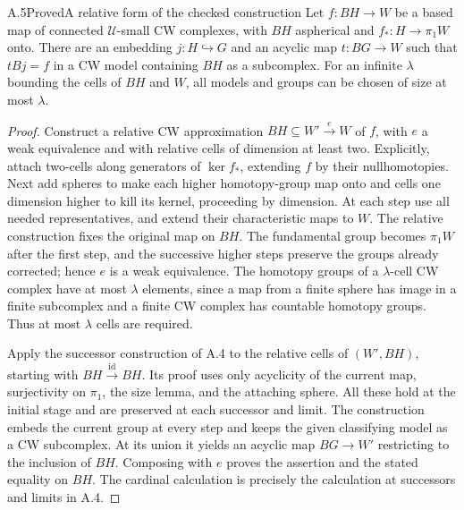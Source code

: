 \begin{claim}{A.5}{Proved}{A relative form of the checked construction}
Let $f:BH\to W$ be a based map of connected $\mathcal U$-small CW
complexes, with $BH$ aspherical and $f_*:H\to\pi_1W$ onto. There are
an embedding $j:H\hookrightarrow G$ and an acyclic map $t:BG\to W$
such that $tBj=f$ in a CW model containing $BH$ as a subcomplex.
For an infinite $\lambda$ bounding the cells of $BH$ and $W$, all
models and groups can be chosen of size at most $\lambda$.
\end{claim}
\begin{proof}
Construct a relative CW approximation $BH\subseteq W'\xrightarrow{e}W$
of $f$, with $e$ a weak equivalence and with relative cells of dimension
at least two. Explicitly, attach two-cells along generators of
$\ker f_*$, extending $f$ by their nullhomotopies. Next add spheres to
make each higher homotopy-group map onto and cells one dimension higher
to kill its kernel, proceeding by dimension. At each step use all
needed representatives, and extend their characteristic maps to $W$.
The relative construction fixes the original map on $BH$. The
fundamental group becomes $\pi_1W$ after the first step, and the
successive higher steps preserve the groups already corrected; hence
$e$ is a weak equivalence. The homotopy groups of a $\lambda$-cell CW
complex have at most $\lambda$ elements, since a map from a finite
sphere has image in a finite subcomplex and a finite CW complex has
countable homotopy groups. Thus at most $\lambda$ cells are required.

Apply the successor construction of A.4 to the relative cells of
$(W',BH)$, starting with $BH\xrightarrow{\mathrm{id}}BH$. Its proof
uses only acyclicity of the current map, surjectivity on $\pi_1$, the
size lemma, and the attaching sphere. All these hold at the initial
stage and are preserved at each successor and limit. The construction
embeds the current group at every step and keeps the given classifying
model as a CW subcomplex. At its union it yields an acyclic map
$BG\to W'$ restricting to the inclusion of $BH$. Composing with $e$
proves the assertion and the stated equality on $BH$. The cardinal
calculation is precisely the calculation at successors and limits in
A.4.
\end{proof}

